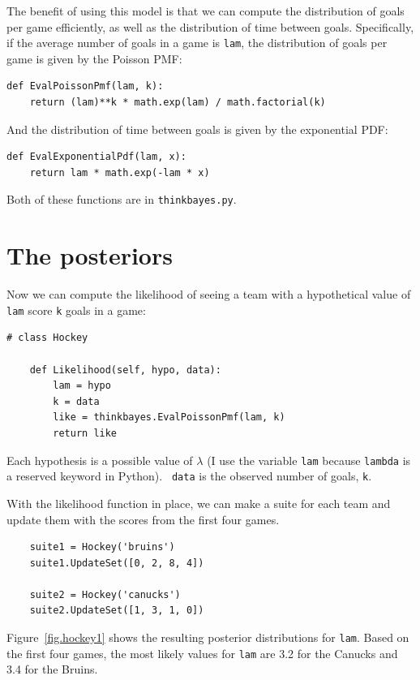 \documentclass[12pt]{book}
\begin{document}
The benefit of using this model is that we can compute the distribution
of goals per game efficiently, as well as the distribution of time
between goals.  Specifically, if the average number of goals
in a game is {\tt lam}, the distribution of goals per game is
given by the Poisson PMF:

\begin{verbatim}
def EvalPoissonPmf(lam, k):
    return (lam)**k * math.exp(lam) / math.factorial(k)
\end{verbatim}  

And the distribution of time between goals is given by the
exponential PDF:

\begin{verbatim}
def EvalExponentialPdf(lam, x):
    return lam * math.exp(-lam * x)
\end{verbatim}  

Both of these functions are in \verb"thinkbayes.py".


\section{The posteriors}

Now we can compute the likelihood of seeing a team with a hypothetical
value of {\tt lam} score {\tt k} goals in a game:

\begin{verbatim}
# class Hockey

    def Likelihood(self, hypo, data):
        lam = hypo
        k = data
        like = thinkbayes.EvalPoissonPmf(lam, k)
        return like
\end{verbatim}

Each hypothesis is a possible value of $\lambda$ (I use the variable
{\tt lam} because {\tt lambda} is a reserved keyword in Python).  {\tt
  data} is the observed number of goals, {\tt k}.

With the likelihood function in place, we can make a suite for each
team and update them with the scores from the first four games.

\begin{verbatim}
    suite1 = Hockey('bruins')
    suite1.UpdateSet([0, 2, 8, 4])
     
    suite2 = Hockey('canucks')
    suite2.UpdateSet([1, 3, 1, 0])
\end{verbatim}  

Figure~\ref{fig.hockey1} shows the resulting posterior distributions
for {\tt lam}.  Based on the first four games, the most likely
values for {\tt lam} are 3.2 for the Canucks and 3.4 for the Bruins.
\end{document}
